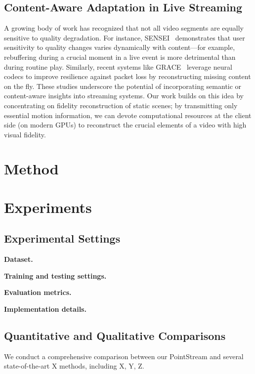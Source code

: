 \subsection{Content-Aware Adaptation in Live Streaming}
A growing body of work has recognized that not all video segments are equally sensitive to quality degradation. 
For instance, SENSEI~\cite{Zhang et al., NSDI '21} demonstrates that user sensitivity to quality changes varies dynamically with content—for example, rebuffering during a crucial moment in a live event is more detrimental than during routine play. 
Similarly, recent systems like GRACE~\cite{Cheng et al., NSDI '24} leverage neural codecs to improve resilience against packet loss by reconstructing missing content on the fly. 
These studies underscore the potential of incorporating semantic or content-aware insights into streaming systems. 
Our work builds on this idea by concentrating on fidelity reconstruction of static scenes; by transmitting only essential motion information, we can devote computational resources at the client side (on modern GPUs) to reconstruct the crucial elements of a video with high visual fidelity.

\newpage

\section{Method}

\section{Experiments}
\subsection{Experimental Settings}

\noindent
\textbf{Dataset.}

\noindent
\textbf{Training and testing settings.}

\noindent
\textbf{Evaluation metrics.}

\noindent
\textbf{Implementation details.}

\subsection{Quantitative and Qualitative Comparisons}
We conduct a comprehensive comparison between our PointStream and
several state-of-the-art X methods, including X, Y, Z.

